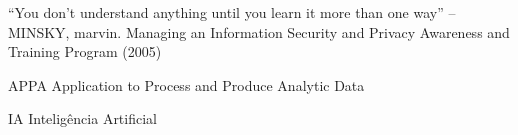\documentclass[12pt,oneside,a4paper,chapter=TITLE, english, french,	spanish, brazil]{abntex2-logatti}
\begin{document}
\begin{epigrafe}
“You don't understand anything until you learn it more than one way” – MINSKY,
marvin. Managing an Information Security and Privacy Awareness and Training
Program (2005)
\end{epigrafe}



\setlength{\absparsep}{18pt} %







\listoffigures*
\cleardoublepage






\begin{siglas}
  \item[APPA] Application to Process and Produce Analytic Data
  \item[IA] Inteligência Artificial
\end{siglas}
\end{document}
